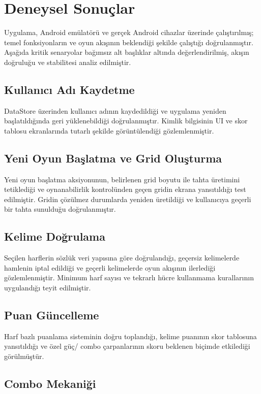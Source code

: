 \documentclass[conference]{IEEEtran}
\begin{document}
\section{Deneysel Sonuçlar}

Uygulama, Android emülatörü ve gerçek Android cihazlar üzerinde
çalıştırılmış; temel fonksiyonların ve oyun akışının beklendiği
şekilde çalıştığı doğrulanmıştır. Aşağıda kritik senaryolar
bağımsız alt başlıklar altında değerlendirilmiş, akışın doğruluğu
ve stabilitesi analiz edilmiştir.

\subsection{Kullanıcı Adı Kaydetme}

DataStore üzerinden kullanıcı adının kaydedildiği ve uygulama
yeniden başlatıldığında geri yüklenebildiği doğrulanmıştır.
Kimlik bilgisinin UI ve skor tablosu ekranlarında tutarlı
şekilde görüntülendiği gözlemlenmiştir.

\subsection{Yeni Oyun Başlatma ve Grid Oluşturma}

Yeni oyun başlatma aksiyonunun, belirlenen grid boyutu ile
tahta üretimini tetiklediği ve oynanabilirlik kontrolünden
geçen gridin ekrana yansıtıldığı test edilmiştir. Gridin
çözülmez durumlarda yeniden üretildiği ve kullanıcıya
geçerli bir tahta sunulduğu doğrulanmıştır.

\subsection{Kelime Doğrulama}

Seçilen harflerin sözlük veri yapısına göre doğrulandığı,
geçersiz kelimelerde hamlenin iptal edildiği ve geçerli
kelimelerde oyun akışının ilerlediği gözlemlenmiştir.
Minimum harf sayısı ve tekrarlı hücre kullanmama
kurallarının uygulandığı teyit edilmiştir.

\subsection{Puan Güncelleme}

Harf bazlı puanlama sisteminin doğru toplandığı, kelime
puanının skor tablosuna yansıtıldığı ve özel güç/ combo
çarpanlarının skoru beklenen biçimde etkilediği
görülmüştür.

\subsection{Combo Mekaniği}
\end{document}
